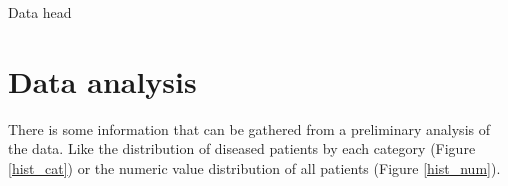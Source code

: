 \documentclass[conference]{IEEEtran}
\begin{document}
\begin{table}[htbp]
    \caption{Data head}
    \begin{center}
        \resizebox{\columnwidth}{!}{%
            
        }%
        \label{data_head}
    \end{center}
\end{table}

\section{Data analysis}

There is some information that can be gathered from a preliminary analysis of the data. Like the distribution of diseased patients by each category (Figure \ref{hist_cat}) or the numeric value distribution of all patients (Figure \ref{hist_num}).
\end{document}
